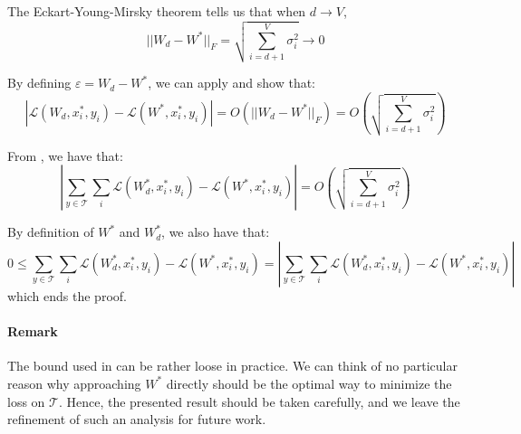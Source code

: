 
The Eckart-Young-Mirsky theorem tells us that when $d \rightarrow V$, 
$$||W_d - W^*||_F = \sqrt{\sum_{i=d+1}^{V} \sigma_i^2} \rightarrow 0$$

By defining $\varepsilon = W_d - W^*$, we can apply  and show that:
$$
\left|\mathcal{L}(W_d, x^*_i, y_i) - \mathcal{L}(W^*, x^*_i, y_i)\right| = O(||W_d - W^*||_F) = O\left(\sqrt{\sum_{i=d+1}^{V} \sigma_i^2}\right)
$$

From , we have that:
$$
\left|\sum_{y \in \mathcal{T}} \sum_{i} \mathcal{L}(W_d^*, x^*_i, y_i) - \mathcal{L}(W^*, x^*_i, y_i)\right| = O\left(\sqrt{\sum_{i=d+1}^{V} \sigma_i^2}\right)
$$

By definition of $W^*$ and $W_d^*$, we also have that:
$$
0 \leq \sum_{y \in \mathcal{T}} \sum_{i} \mathcal{L}(W_d^*, x^*_i, y_i) - \mathcal{L}(W^*, x^*_i, y_i) = \left|\sum_{y \in \mathcal{T}} \sum_{i} \mathcal{L}(W_d^*, x^*_i, y_i) - \mathcal{L}(W^*, x^*_i, y_i)\right|
$$
which ends the proof.

\paragraph{Remark} The bound used in  can be rather loose in practice. We can think of no particular reason why approaching $W^*$ directly should be the optimal way to minimize the loss on $\mathcal{T}$. Hence, the presented result should be taken carefully, and we leave the refinement of such an analysis for future work.




